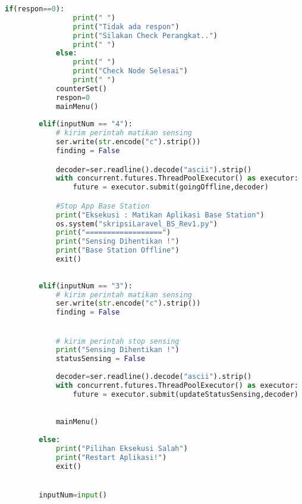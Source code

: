 \begin{lstlisting}[language=Python, caption=BaseStation.py]
            if(respon==0):
                print(" ")
                print("Tidak ada respon")
                print("Silakan Check Perangkat..")
                print(" ")
            else:
                print(" ")
                print("Check Node Selesai")
                print(" ")
            counterSet()
            respon=0
            mainMenu()
                        
        elif(inputNum == "4"):
            # kirim perintah matikan sensing   
            ser.write(str.encode("c").strip())
            finding = False

            decoder=ser.readline().decode("ascii").strip()
            with concurrent.futures.ThreadPoolExecutor() as executor:  
                future = executor.submit(goingOffline,decoder)

            #Stop App Base Station
            print("Eksekusi : Matikan Aplikasi Base Station")
            os.system("skripsiLaravel_BS_Rev1.py")
            print("==================")
            print("Sensing Dihentikan !")
            print("Base Station Offline")
            exit()
            
            
        elif(inputNum == "3"):
            # kirim perintah matikan sensing   
            ser.write(str.encode("c").strip())
            finding = False


            # kirim perintah stop sensing 
            print("Sensing Dihentikan !")
            statusSensing = False
            
            decoder=ser.readline().decode("ascii").strip()
            with concurrent.futures.ThreadPoolExecutor() as executor:  
                future = executor.submit(updateStatusSensing,decoder)

            
            mainMenu()
        
        else:
            print("Pilihan Eksekusi Salah")
            print("Restart Aplikasi!")
            exit()


        inputNum=input()
\end{lstlisting}

%  



